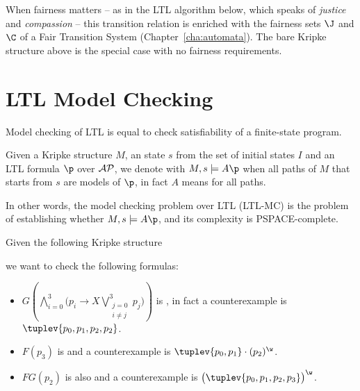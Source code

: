 \documentclass[oneside]{academica}
\begin{document}
\begin{note}
  When fairness matters -- as in the LTL algorithm below, which speaks of \emph{justice} and \emph{compassion} -- this transition relation is enriched with the fairness sets $\J$ and $\C$ of a Fair Transition System (Chapter~\ref{cha:automata}). The bare Kripke structure above is the special case with no fairness requirements.
\end{note}

\section{LTL Model Checking}

Model checking of LTL is equal to check satisfiability of a finite-state program.

\begin{definition*}
  Given a Kripke structure $M$, an state $s$ from the set of initial states $I$ and an LTL formula $\p$ over ${\mathcal{AP}}$, we denote with $M,s \models A\p$ when all paths of $M$ that starts from $s$ are models of $\p$, in fact $A$ means for all paths.

  In other words, the model checking problem over LTL (LTL-MC) is the problem of establishing whether $M,s \models A\p$, and its complexity is PSPACE-complete.
\end{definition*}

\begin{example*}
  Given the following Kripke structure
  \begin{center}
    
  \end{center}
  we want to check the following formulas:
  \begin{itemize}
    \item $\displaystyle G \left( \bigwedge^3_{i=0} \Big(p_i \to X \bigvee^3_{\substack{j=0 \\ i \neq j}} p_j \Big) \right)$ is \false, in fact a counterexample is $\tuplev{p_0,p_1,p_2,p_2}$.
    \item $F(p_3)$ is \false and a counterexample is $\tuplev{p_0,p_1} \cdot (p_2)^\w$.
    \item $FG(p_2)$ is also \false and a counterexample is $\big(\tuplev{p_0,p_1,p_2,p_3}\big)^\w$.
  \end{itemize}
\end{example*}
\end{document}
